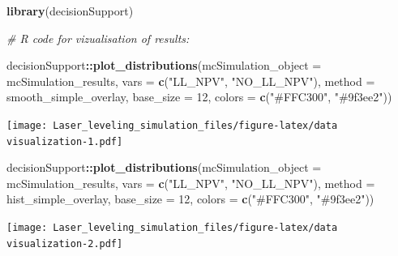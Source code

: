 \documentclass[
]{article}
\newenvironment{Shaded}{\begin{snugshade}}{\end{snugshade}}
\newcommand{\AttributeTok}[1]{\textcolor[rgb]{0.13,0.29,0.53}{#1}}
\newcommand{\CommentTok}[1]{\textcolor[rgb]{0.56,0.35,0.01}{\textit{#1}}}
\newcommand{\DecValTok}[1]{\textcolor[rgb]{0.00,0.00,0.81}{#1}}
\newcommand{\FunctionTok}[1]{\textcolor[rgb]{0.13,0.29,0.53}{\textbf{#1}}}
\newcommand{\NormalTok}[1]{#1}
\newcommand{\SpecialCharTok}[1]{\textcolor[rgb]{0.81,0.36,0.00}{\textbf{#1}}}
\newcommand{\StringTok}[1]{\textcolor[rgb]{0.31,0.60,0.02}{#1}}
\begin{document}
\begin{Shaded}
\begin{Highlighting}[]
\FunctionTok{library}\NormalTok{(decisionSupport)}

\CommentTok{\# R code for vizualisation of results:}

\NormalTok{decisionSupport}\SpecialCharTok{::}\FunctionTok{plot\_distributions}\NormalTok{(}\AttributeTok{mcSimulation\_object =}\NormalTok{ mcSimulation\_results, }
                                    \AttributeTok{vars =} \FunctionTok{c}\NormalTok{(}\StringTok{"LL\_NPV"}\NormalTok{, }\StringTok{"NO\_LL\_NPV"}\NormalTok{),}
                                    \AttributeTok{method =} \StringTok{\textquotesingle{}smooth\_simple\_overlay\textquotesingle{}}\NormalTok{, }
                                    \AttributeTok{base\_size =} \DecValTok{12}\NormalTok{,}
                                    \AttributeTok{colors =} \FunctionTok{c}\NormalTok{(}\StringTok{"\#FFC300"}\NormalTok{, }\StringTok{"\#9f3ee2"}\NormalTok{))}
\end{Highlighting}
\end{Shaded}

\texttt{[image: Laser\_leveling\_simulation\_files/figure-latex/data visualization-1.pdf]}

\begin{Shaded}
\begin{Highlighting}[]
\NormalTok{decisionSupport}\SpecialCharTok{::}\FunctionTok{plot\_distributions}\NormalTok{(}\AttributeTok{mcSimulation\_object =}\NormalTok{ mcSimulation\_results, }
                                    \AttributeTok{vars =} \FunctionTok{c}\NormalTok{(}\StringTok{"LL\_NPV"}\NormalTok{, }\StringTok{"NO\_LL\_NPV"}\NormalTok{),}
                                    \AttributeTok{method =} \StringTok{\textquotesingle{}hist\_simple\_overlay\textquotesingle{}}\NormalTok{, }
                                    \AttributeTok{base\_size =} \DecValTok{12}\NormalTok{,}
                                    \AttributeTok{colors =} \FunctionTok{c}\NormalTok{(}\StringTok{"\#FFC300"}\NormalTok{, }\StringTok{"\#9f3ee2"}\NormalTok{))}
\end{Highlighting}
\end{Shaded}

\texttt{[image: Laser\_leveling\_simulation\_files/figure-latex/data visualization-2.pdf]}
\end{document}
